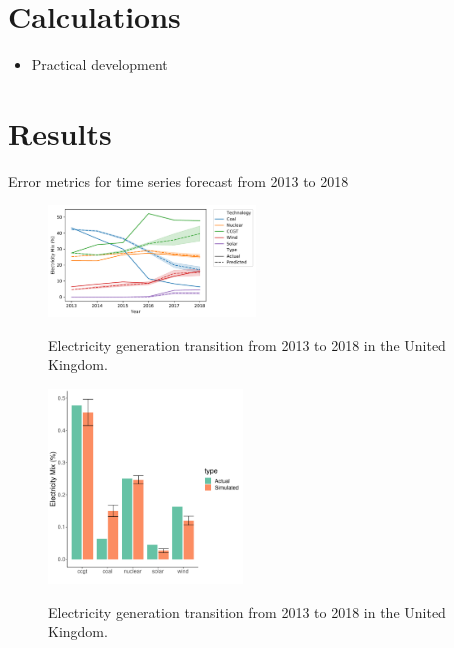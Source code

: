 \documentclass[final,3p,times,twocolumn,numbers]{elsarticle}
\begin{document}
\section{Calculations}
\label{sec:calculations}

\begin{itemize}
	\item Practical development
\end{itemize}

\section{Results}
\label{sec:results}

\begin{table}[htb]
    \centering
{}
    \caption{Error metrics for time series forecast from 2013 to 2018}\label{table:metrics}
\end{table}


\begin{figure}
\centering
\includegraphics[width=0.49\textwidth]{figures/results/throughout_years.pdf}
\label{uk_historical_mix}
\caption{Electricity generation transition from 2013 to 2018 in the United Kingdom.}
\end{figure}


\begin{figure}
\centering
\includegraphics[width=0.46\textwidth]{figures/results/best_run.pdf}
\label{uk_historical_mix}
\caption{Electricity generation transition from 2013 to 2018 in the United Kingdom.}
\end{figure}
\end{document}
